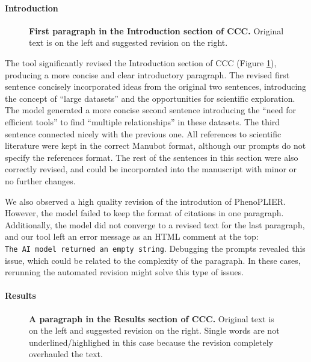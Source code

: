 \documentclass[
]{article}
\begin{document}
\hypertarget{introduction-1}{%
\paragraph{Introduction}\label{introduction-1}}

\begin{figure}
\hypertarget{fig:intro:ccc}{%
\centering

\caption{\textbf{First paragraph in the Introduction section of CCC.}
Original text is on the left and suggested revision on the right.}\label{fig:intro:ccc}
}
\end{figure}

The tool significantly revised the Introduction section of CCC (Figure \ref{fig:intro:ccc}), producing a more concise and clear introductory paragraph.
The revised first sentence concisely incorporated ideas from the original two sentences, introducing the concept of ``large datasets'' and the opportunities for scientific exploration.
The model generated a more concise second sentence introducing the ``need for efficient tools'' to find ``multiple relationships'' in these datasets.
The third sentence connected nicely with the previous one.
All references to scientific literature were kept in the correct Manubot format, although our prompts do not specify the references format.
The rest of the sentences in this section were also correctly revised, and could be incorporated into the manuscript with minor or no further changes.

We also observed a high quality revision of the introdution of PhenoPLIER.
However, the model failed to keep the format of citations in one paragraph.
Additionally, the model did not converge to a revised text for the last paragraph, and our tool left an error message as an HTML comment at the top: \texttt{The\ AI\ model\ returned\ an\ empty\ string}.
Debugging the prompts revealed this issue, which could be related to the complexity of the paragraph.
In these cases, rerunning the automated revision might solve this type of issues.

\hypertarget{results}{%
\paragraph{Results}\label{results}}

\begin{figure}
\hypertarget{fig:results:ccc}{%
\centering

\caption{\textbf{A paragraph in the Results section of CCC.}
Original text is on the left and suggested revision on the right.
Single words are not underlined/highlighed in this case because the revision completely overhauled the text.}\label{fig:results:ccc}
}
\end{figure}
\end{document}
